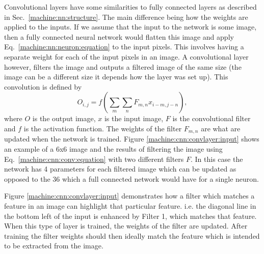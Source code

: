 Convolutional layers have some similarities to fully connected layers as described in Sec.~\ref{machine:nn:structure}. 
The main difference being how the weights are applied to the inputs.
If we assume that the input to the network is some image, then a fully connected neural network would flatten this image and apply Eq.~\ref{machine:nn:neuron:equation} to the input pixels.
This involves having a separate weight for each of the input pixels in an image.
A convolutional layer however, filters the image and outputs a filtered image of the same size (the image can be a different size it depends how the layer was set up).
This convolution is defined by
\begin{equation}
\label{machine:cnn:conv:equation}
O_{i,j} = f\left( \sum_{m} \sum_{n} F_{m,n}x_{i-m,j-n}\right) ,
\end{equation}
where $O$ is the output image, $x$ is the input image, $F$ is the convolutional filter and $f$ is the activation function.
The weights of the filter $F_{m,n}$ are what are updated when the network is trained.
Figure \ref{machine:cnn:convlayer:input} shows an example of a 6x6 image and the results of filtering the image using Eq.~\ref{machine:cnn:conv:equation} with two different filters $F$. 
In this case the network has 4 parameters for each filtered image which can be updated as opposed to the 36 which a full connected network would have for a single neuron.

Figure \ref{machine:cnn:convlayer:input} demonstrates how a filter which matches a feature in an image can highlight that particular feature. 
i.e. the diagonal line in the bottom left of the input is enhanced by Filter 1, which matches that feature. 
When this type of layer is trained, the weights of the filter are updated. After training the filter weights should then ideally match the feature which is intended to be extracted from the image.

